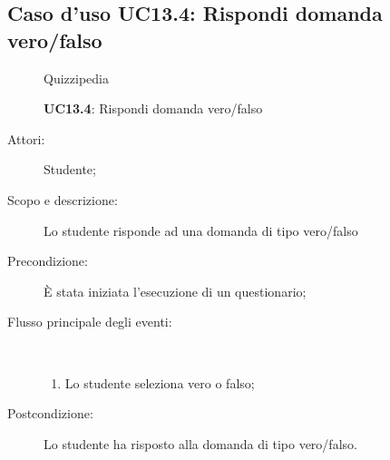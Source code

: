 \subsection{Caso d'uso UC13.4: Rispondi domanda vero/falso}
	\begin{figure}[H]
		\centering
		\begin{resizedtikzpicture}{\textwidth}
		\begin{umlsystem}[x=0, fill=lightgray!20]{Quizzipedia}
		\end{umlsystem}
		\end{resizedtikzpicture}
		\caption{\textbf{UC13.4}: Rispondi domanda vero/falso}
		\label{UC13.4}
	\end{figure}
\begin{description}
\item[Attori:] Studente;
\item[Scopo e descrizione:] Lo studente risponde ad una domanda di tipo vero/falso
      \item[Precondizione:] È stata iniziata l'esecuzione di un questionario;

        \item[Flusso principale degli eventi:] \ 
 \begin{enumerate}
          \item Lo studente seleziona vero o falso;

      \end{enumerate}
    \item[Postcondizione:] Lo studente ha risposto alla domanda di tipo vero/falso.
  \end{description}
\hypertarget{UC13.5}{}
